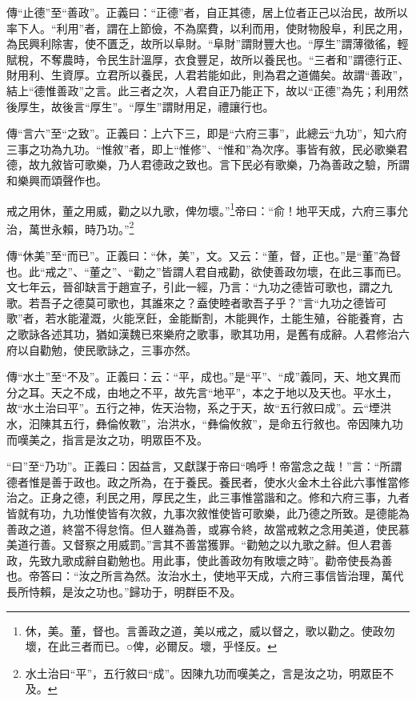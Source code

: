{\noindent\zhuan{}\fzbyks 傳“止德”至“善政”。正義曰：“正德”者，自正其德，居上位者正己以治民，故所以率下人。“利用”者，謂在上節儉，不為縻費，以利而用，使財物殷阜，利民之用，為民興利除害，使不匱乏，故所以阜財。“阜財”謂財豐大也。“厚生”謂薄徵徭，輕賦稅，不奪農時，令民生計溫厚，衣食豐足，故所以養民也。“三者和”謂德行正、財用利、生資厚。立君所以養民，人君若能如此，則為君之道備矣。故謂“善政”，結上“德惟善政”之言。此三者之次，人君自正乃能正下，故以“正德”為先；利用然後厚生，故後言“厚生”。“厚生”謂財用足，禮讓行也。 \par}

{\noindent\zhuan{}\fzbyks 傳“言六”至“之致”。正義曰：上六下三，即是“六府三事”，此總云“九功”，知六府三事之功為九功。“惟敘”者，即上“惟修”、“惟和”為次序。事皆有敘，民必歌樂君德，故九敘皆可歌樂，乃人君德政之致也。言下民必有歌樂，乃為善政之驗，所謂和樂興而頌聲作也。 \par}

戒之用休，董之用威，勸之以九歌，俾勿壞。”\footnote{休，美。董，督也。言善政之道，美以戒之，威以督之，歌以勸之。使政勿壞，在此三者而已。○俾，必爾反。壞，乎怪反。}帝曰：“俞！地平天成，六府三事允治，萬世永賴，時乃功。”\footnote{水土治曰“平”，五行敘曰“成”。因陳九功而嘆美之，言是汝之功，明眾臣不及。}

{\noindent\zhuan{}\fzbyks 傳“休美”至“而已”。正義曰：“休，美”，文。又云：“董，督，正也。”是“董”為督也。此“戒之”、“董之”、“勸之”皆謂人君自戒勸，欲使善政勿壞，在此三事而已。文七年云，晉卻缺言于趙宣子，引此一經，乃言：“九功之德皆可歌也，謂之九歌。若吾子之德莫可歌也，其誰來之？盍使睦者歌吾子乎？”言“九功之德皆可歌”者，若水能灌溉，火能烹飪，金能斷割，木能興作，土能生殖，谷能養育，古之歌詠各述其功，猶如漢魏已來樂府之歌事，歌其功用，是舊有成辭。人君修治六府以自勸勉，使民歌詠之，三事亦然。 \par}

{\noindent\zhuan{}\fzbyks 傳“水土”至“不及”。正義曰：云：“平，成也。”是“平”、“成”義同，天、地文異而分之耳。天之不成，由地之不平，故先言“地平”，本之于地以及天也。平水土，故“水土治曰平”。五行之神，佐天治物，系之于天，故“五行敘曰成”。云“堙洪水，汩陳其五行，彝倫攸斁”，治洪水，“彝倫攸敘”，是命五行敘也。帝因陳九功而嘆美之，指言是汝之功，明眾臣不及。 \par}

{\noindent\shu{}\fzkt “曰”至“乃功”。正義曰：因益言，又獻謀于帝曰“嗚呼！帝當念之哉！”言：“所謂德者惟是善于政也。政之所為，在于養民。養民者，使水火金木土谷此六事惟當修治之。正身之德，利民之用，厚民之生，此三事惟當諧和之。修和六府三事，九者皆就有功，九功惟使皆有次敘，九事次敘惟使皆可歌樂，此乃德之所致。是德能為善政之道，終當不得怠惰。但人雖為善，或寡令終，故當戒敕之念用美道，使民慕美道行善。又督察之用威罰。”言其不善當獲罪。“勸勉之以九歌之辭。但人君善政，先致九歌成辭自勸勉也。用此事，使此善政勿有敗壞之時”。勸帝使長為善也。帝答曰：“汝之所言為然。汝治水土，使地平天成，六府三事信皆治理，萬代長所恃賴，是汝之功也。”歸功于，明群臣不及。 \par}

